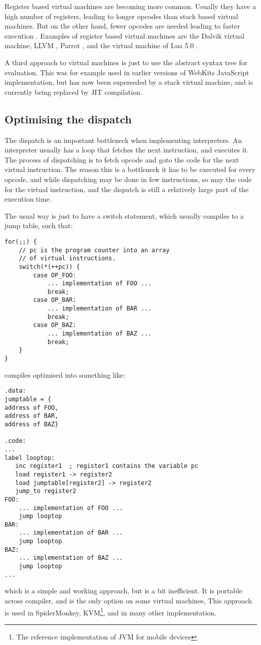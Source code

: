 \documentclass[11pt]{report}
\begin{document}
Register based virtual machines are becoming more common. 
Usually they have a high number of registers, leading to longer opcodes than stack based virtual machines. But on the other hand, fewer opcodes are needed leading to faster execution \cite{register-vs-stack1, register-vs-stack2}. 
Examples of register based virtual machines are the Dalvik \cite{dalvik-vm} virtual machine, LLVM \cite{llvm}, Parrot \cite{parrot}, and the virtual machine of Lua 5.0 \cite{luavm}.

A third approach to virtual machines is just to use the abstract syntax tree for evaluation. This was for example used in earlier versions of WebKits JavaScript implementation, but has now been superseded by a stack virtual machine, and is currently being replaced by JIT compilation.

\subsection{Optimising the dispatch}
The dispatch is an important bottleneck when implementing interpreters.
An interpreter usually has a loop that fetches the next instruction, and executes it. The process of dispatching is to fetch opcode and goto the code for the next virtual instruction.
The reason this is a bottleneck it has to be executed for every opcode, and while dispatching may be done in few instructions, so may the code for the virtual instruction, and the dispatch is still a relatively large part of the execution time. 

The usual way is just to have a switch statement, which usually compiles to a jump table, such that:
\begin{verbatim}
for(;;) {
    // pc is the program counter into an array
    // of virtual instructions.
    switch(*(++pc)) { 
        case OP_FOO:
            ... implementation of FOO ...
            break; 
        case OP_BAR:
            ... implementation of BAR ...
            break; 
        case OP_BAZ:
            ... implementation of BAZ ...
            break; 
    }
}
\end{verbatim}
compiles optimised into something like:
\begin{verbatim}
.data:
jumptable = {
address of FOO,
address of BAR,
address of BAZ}

.code:
...
label looptop:
   inc register1  ; register1 contains the variable pc
   load register1 -> register2
   load jumptable[register2] -> register2
   jump_to register2
FOO:
    ... implementation of FOO ...
    jump looptop
BAR:
    ... implementation of BAR ...
    jump looptop
BAZ:
    ... implementation of BAZ ...
    jump looptop
...
\end{verbatim}
which is a simple and working approach, but is a bit inefficient. It is portable across compiler, and is the only option on some virtual machines,
This approach is used in SpiderMonkey, KVM\footnote{The reference implementation of JVM for mobile devices}, and in many other implementation.
\end{document}

